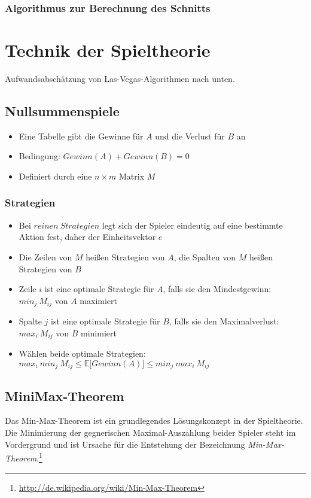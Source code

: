 \subsubsection{Algorithmus zur Berechnung des Schnitts}




\section{Technik der Spieltheorie}
Aufwandsabschätzung von Las-Vegas-Algorithmen nach unten.

\subsection{Nullsummenspiele}
\begin{itemize}
	\item Eine Tabelle gibt die Gewinne für \(A\) und die Verlust für \(B\) an
	\item Bedingung: \(Gewinn(A) + Gewinn(B) = 0\)
	\item Definiert durch eine \(n \times m\) Matrix \(M\)
\end{itemize}

\subsubsection{Strategien}
\begin{itemize}
	\item Bei \(reinen~Strategien\) legt sich der Spieler eindeutig auf eine bestimmte Aktion fest, daher der Einheitsvektor \(e\)
	\item Die Zeilen von \(M\) heißen Strategien von \(A\), die Spalten von \(M\) heißen Strategien von \(B\)
	\item Zeile \(i\) ist eine optimale Strategie für \(A\), falls sie den Mindestgewinn: \(min_j~M_{ij}\) von \(A\) maximiert
	\item Spalte \(j\) ist eine optimale Strategie für \(B\), falls sie den Maximalverlust: \(max_i~M_{ij}\) von \(B\) minimiert
	\item Wählen beide optimale Strategien: \(max_i~min_j~M_{ij} \leq \mathbb{E} \lbrack Gewinn(A) \rbrack \leq min_j~max_i~M_{ij}\)
\end{itemize}


\subsection{MiniMax-Theorem}
Das Min-Max-Theorem ist ein grundlegendes Lösungskonzept in der Spieltheorie. Die Minimierung der gegnerischen Maximal-Auszahlung beider Spieler steht im Vordergrund und ist Ursache für die Entstehung der Bezeichnung \textit{Min-Max-Theorem}.\footnote{\url{http://de.wikipedia.org/wiki/Min-Max-Theorem}}

